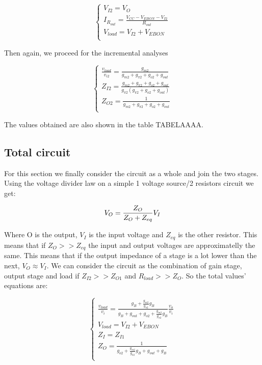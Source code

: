 \begin{equation}\label{eq:Op2}
\begin{cases}
V_{I2}=V_O\\
I_{R_{out}}= \frac{V_{CC}-V_{EBON}-V_{I2}}{R_{out}}\\
V_{load}=V_{I2}+ V_{EBON}\\
\end{cases}
\end{equation}

Then again, we proceed for the incremental analyses

\begin{equation}\label{eq:v2}
\begin{cases}
\frac{v_{load}}{v_{i2}}=\frac{g_{m2}}{g_{m2}+g_{\pi 2}+g_{o2}+g_{out}}\\
Z_{I2}= \frac{g_{m2}+g_{\pi 2}+ g_{o2}+g_{out}}{g_{\pi 2} (g_{\pi 2}+ g_{o2}+g_{out})}\\
Z_{O2}= \frac{1}{g_{m2}+g_{\pi 2}+ g_{o2}+g_{out}}\\
\end{cases}
\end{equation}

The values obtained are also shown in the table TABELAAAA.


\subsection{Total circuit}
For this section we finally consider the circuit as a whole and join the two stages. Using the voltage divider law on a simple 1 voltage source/2 resistors circuit we get:

\begin{equation}\label{eq:approx}
V_O=\frac{Z_O}{Z_O+Z_{eq}}V_I\\
\end{equation}

 Where O is the output, $V_I$ is the input voltage and $Z_{eq}$ is the other resistor. This means that if $Z_O >> Z_{eq}$ the input and output voltages are approximatelly the same. This means that if the output impedance of a stage is a lot lower than the next, $V_O\approx V_I$. We can consider the circuit as the combination of gain stage, output stage and load if $Z_{I2} >> Z_{O1}$ and $R_{load} >> Z_{O}$. So the total values' equations are:
 
\begin{equation}\label{eq:final}
\begin{cases}
\frac{v_{load}}{v_i}=\frac{g_B+\frac{g_{m2}}{g_{\pi 2}} g_B}{g_B+g_{out}+g_{o2}+\frac{g_{m2}}{g_{\pi 2}} g_B} \frac{v_o}{v_i}\\
V_{load}=V_{I2}+ V_{EBON}\\
Z_I=Z_{I1}\\
Z_O=\frac{1}{g_{o2}+\frac{g_{m2}}{g_{\pi 2}} g_B+g_{out}+g_B}\\
\end{cases}
\end{equation}

